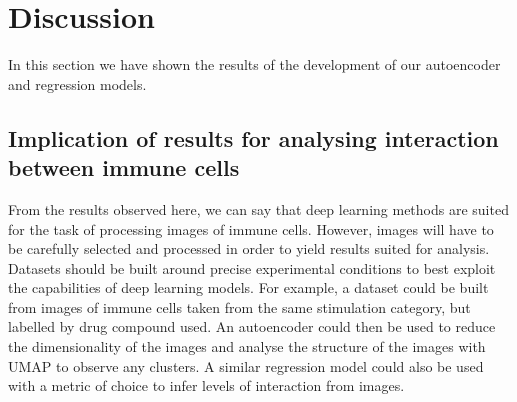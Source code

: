 \section{Discussion}

In this section we have shown the results of the development of our autoencoder and regression models.




\subsection{Implication of results for analysing interaction between immune cells}

From the results observed here, we can say that deep learning methods are suited for the task of processing images of immune cells. However, images will have to be carefully selected and processed in order to yield results suited for analysis. Datasets should be built around precise experimental conditions to best exploit the capabilities of deep learning models. For example, a dataset could be built from images of immune cells taken from the same stimulation category, but labelled by drug compound used. An autoencoder could then be used to reduce the dimensionality of the images and analyse the structure of the images with UMAP to observe any clusters. A similar regression model could also be used with a metric of choice to infer levels of interaction from images.
